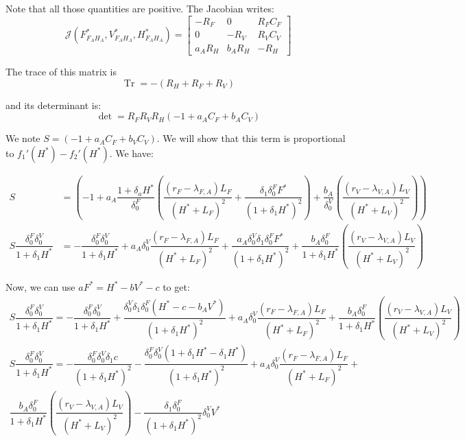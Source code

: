 \documentclass{article}
\newcommand{\lfa}{\lambda_{F, A}}
\newcommand{\lva}{\lambda_{V, A}}
\newcommand{\df}{\delta_0^F}
\newcommand{\dv}{\delta_0^V}
\DeclareMathOperator{\Tr}{Tr}
\begin{document}
Note that all those quantities are positive.
The Jacobian writes:
\begin{equation}
\mathcal{J}(F^*_{F_AH_A}, V^*_{F_AH_A}, H^*_{F_AH_A}) =  \begin{bmatrix}
- R_F & 0 & R_F C_F\\
0 & - R_V & R_V C_V \\
a_A R_H & b_A R_H & -R_H
\end{bmatrix}
\end{equation}

The trace of this matrix is
$$
\Tr = -(R_H + R_F + R_V)
$$

and its determinant is:
$$
\det = R_FR_VR_H \left(-1 + a_A C_F + b_A C_V \right)
$$

We note $S = \left(-1 + a_A C_F + b_V C_V \right)$. We will show that this term is proportional to $f_1'(H^*) - f_2'(H^*)$. We have:

\begin{align*}
S &= \left(-1 + a_A \dfrac{1 + \delta_a H^*}{\df} \left( \dfrac{(r_F - \lfa)L_F}{(H^* + L_F)^2} + \dfrac{\delta_1 \df F^*}{(1 + \delta_1 H^*)^2} \right) + \dfrac{b_A}{\dv} \left( \dfrac{(r_V - \lva)L_V}{(H^* + L_V)^2} \right) \right) \\
S \dfrac{\df \dv}{1 + \delta_1 H^*}  &= -\dfrac{\df \dv}{1 + \delta_1 H^*} + a_A \dv \dfrac{(r_F - \lfa)L_F}{(H^* + L_F)^2} +  \dfrac{a_A \dv \delta_1 \df F^*}{(1 + \delta_1 H^*)^2} + \dfrac{b_A \df}{1 + \delta_1 H^*} \left( \dfrac{(r_V - \lva)L_V}{(H^* + L_V)^2} \right)
\end{align*}

Now, we can use $a F^* = H^* - bV^* - c$ to get:
\begin{multline*}
S \dfrac{\df \dv}{1 + \delta_1 H^*}  = -\dfrac{\df \dv}{1 + \delta_1 H^*}  +  \dfrac{\dv \delta_1 \df (H^*-c-b_AV^*)}{(1 + \delta_1 H^*)^2} +  a_A \dv \dfrac{(r_F - \lfa)L_F}{(H^* + L_F)^2} + \dfrac{b_A \df}{1 + \delta_1 H^*} \left( \dfrac{(r_V - \lva)L_V}{(H^* + L_V)^2} \right)
\end{multline*}
\begin{multline*}
S \dfrac{\df \dv}{1 + \delta_1 H^*}   = -\dfrac{\df \dv \delta_1 c}{(1 + \delta_1 H^*)^2} - \dfrac{\df \dv (1 + \delta_1 H^* - \delta_1 H^*)}{(1 + \delta_1 H^*)^2} + a_A \dv \dfrac{(r_F - \lfa)L_F}{(H^* + L_F)^2} + \\ \dfrac{b_A \df}{1 + \delta_1 H^*} \left( \dfrac{(r_V - \lva)L_V}{(H^* + L_V)^2} \right) -  \dfrac{\delta_1 \df}{(1 + \delta_1 H^*)^2} \dv V^*
\end{multline*}
\end{document}
